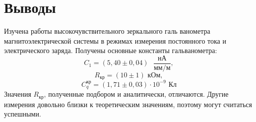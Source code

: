 \section{Выводы}

Изучена работы высокочувствительного зеркального галь­ ванометра магнитоэлектрической системы в режимах измерения постоян­ного тока и электрического заряда. Получены основные константы гальванометра:
\[C_1 = (5,40 \pm 0,04) \text{ } \frac{\text{нА}}{\text{мм/м}},\]
\[R_\text{кр} = (10 \pm 1) \text{ кОм},\]
\[C_q^\text{кр} = (1,71 \pm 0,03) \cdot 10^{-9}\text{ Кл}\]
Значения $R_\text{кр}$, полученные подбором и аналитически, отличаются. Другие измерения довольно близки к теоретическим значениям, поэтому могут считаться успешными.
